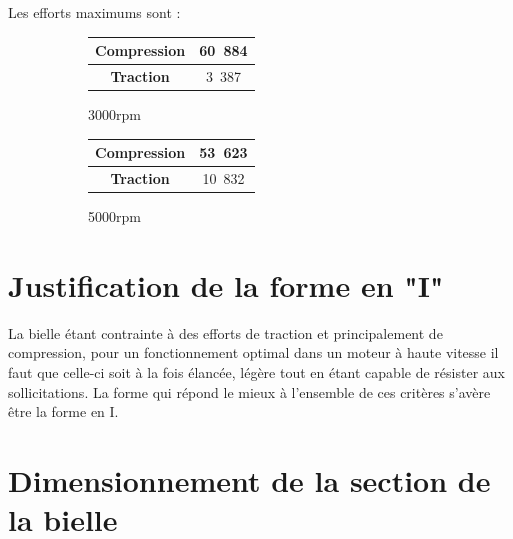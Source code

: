 \documentclass{article}
\begin{document}
Les efforts maximums sont : 


\begin{figure}[h!]
\centering
    \begin{subfigure}[b]{0.45\textwidth}
    \begin{tabular}{|c|c|}
		\hline 
		\textbf{Compression} & \unit{60.884}{\kilo\newton} \\ 
		\hline 
		\textbf{Traction} & \unit{3.387}{\kilo\newton} \\ 
		\hline 
		\end{tabular} 
        \caption{\unit{3000}{rpm}}
    \end{subfigure}
    \begin{subfigure}[b]{0.45\textwidth}
        \begin{tabular}{|c|c|}
		\hline 
		\textbf{Compression} & \unit{53.623}{\kilo\newton} \\ 
		\hline 
		\textbf{Traction} & \unit{10.832}{\kilo\newton} \\ 
		\hline 
		\end{tabular} 
        \caption{\unit{5000}{rpm}}
    \end{subfigure}
    \caption{}
\end{figure}



\section{Justification de la forme en "I"}
La bielle étant contrainte à des efforts de traction et principalement de compression, pour un fonctionnement optimal dans un moteur à haute vitesse il faut que celle-ci soit à la fois élancée, légère tout en étant capable de résister aux sollicitations. La forme qui répond le mieux à l'ensemble de ces critères s'avère être la forme en I.



\section{Dimensionnement de la section de la bielle}
\end{document}
